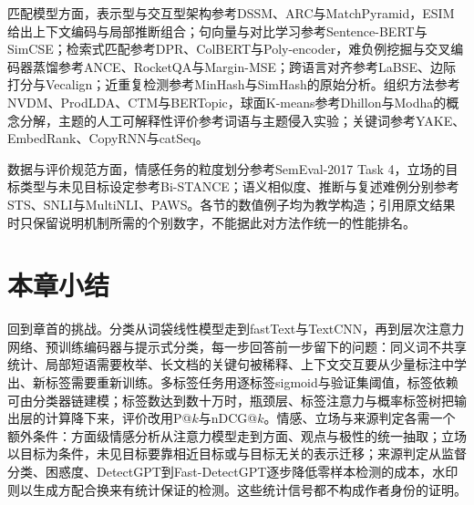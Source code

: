 匹配模型方面，表示型与交互型架构参考DSSM、ARC与MatchPyramid\cite{rs-h10,nlp-matching-hu2014arc,nlp-matching-pang2016matchpyramid}，ESIM给出上下文编码与局部推断组合\cite{nlp-chen2017esim}；句向量与对比学习参考Sentence-BERT与SimCSE\cite{nlp-reimers2019sbert,nlp-gao2021simcse}；检索式匹配参考DPR、ColBERT与Poly-encoder\cite{nlp-karpukhin2020dpr,nlp-khattab2020colbert,nlp-matching-humeau2020polyencoder}，难负例挖掘与交叉编码器蒸馏参考ANCE、RocketQA与Margin-MSE\cite{rs-s03,nlp-matching-qu2021rocketqa,nlp-matching-hofstatter2020margin}；跨语言对齐参考LaBSE、边际打分与Vecalign\cite{nlp-matching-feng2022labse,nlp-matching-artetxe2019margin,nlp-matching-thompson2019vecalign}；近重复检测参考MinHash与SimHash的原始分析\cite{nlp-broder1997resemblance,nlp-charikar2002similarity}。组织方法参考NVDM、ProdLDA、CTM与BERTopic\cite{nlp-miao2016nvdm,nlp-srivastava2017prodlda,nlp-intro-bianchi2021,nlp-bianchi2021ctm,nlp-grootendorst2022bertopic}，球面K-means参考Dhillon与Modha的概念分解\cite{nlp-organization-dhillon2001concept}，主题的人工可解释性评价参考词语与主题侵入实验\cite{nlp-organization-chang2009tea}；关键词参考YAKE、EmbedRank、CopyRNN与catSeq\cite{nlp-campos2020yake,nlp-bennani2018embedrank,nlp-meng2017copyrnn,nlp-organization-yuan2020catseq}。

数据与评价规范方面，情感任务的粒度划分参考SemEval-2017 Task 4\cite{nlp-rosenthal2017sentiment}，立场的目标类型与未见目标设定参考Bi-STANCE\cite{nlp-zhao2025bistance}；语义相似度、推断与复述难例分别参考STS、SNLI与MultiNLI、PAWS\cite{nlp-intro-cer2017,nlp-bowman2015snli,nlp-intro-williams2018,nlp-intro-zhang2019paws}。各节的数值例子均为教学构造；引用原文结果时只保留说明机制所需的个别数字，不能据此对方法作统一的性能排名。

\section{本章小结}
\label{sec:nlp-classification-summary}

回到章首的挑战。分类从词袋线性模型走到fastText与TextCNN，再到层次注意力网络、预训练编码器与提示式分类，每一步回答前一步留下的问题：同义词不共享统计、局部短语需要枚举、长文档的关键句被稀释、上下文交互要从少量标注中学出、新标签需要重新训练。多标签任务用逐标签sigmoid与验证集阈值，标签依赖可由分类器链建模；标签数达到数十万时，瓶颈层、标签注意力与概率标签树把输出层的计算降下来，评价改用P@$k$与nDCG@$k$。情感、立场与来源判定各需一个额外条件：方面级情感分析从注意力模型走到方面、观点与极性的统一抽取；立场以目标为条件，未见目标要靠相近目标或与目标无关的表示迁移；来源判定从监督分类、困惑度、DetectGPT到Fast-DetectGPT逐步降低零样本检测的成本，水印则以生成方配合换来有统计保证的检测。这些统计信号都不构成作者身份的证明。

